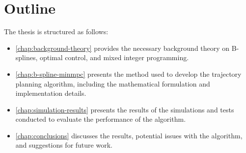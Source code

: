 \section{Outline}
The thesis is structured as follows:
\begin{itemize}
    \item \cref{chap:background-theory} provides the necessary background theory on B-splines, optimal control, and mixed integer programming.
    \item \cref{chap:b-spline-minmpc} presents the method used to develop the trajectory planning algorithm, including the mathematical formulation and implementation details.
    \item \cref{chap:simulation-results} presents the results of the simulations and tests conducted to evaluate the performance of the algorithm.
    \item \cref{chap:conclusions} discusses the results, potential issues with the algorithm, and suggestions for future work.
\end{itemize}